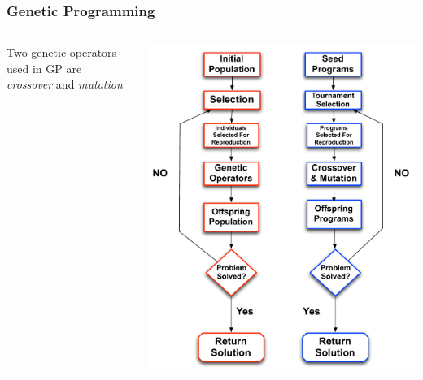 \documentclass{beamer}
\begin{document}
\begin{frame}
	\frametitle{Genetic Programming}

\begin{columns}[C]
\begin{column}{0.5\textwidth}


Two genetic operators used in GP are \textit{crossover} and \textit{mutation}


\end{column}
\begin{column}{0.5\textwidth}
   \includegraphics[height=0.85\textheight]{Illustrations/GP3.pdf}

\end{column}
\end{columns}

\end{frame}
\end{document}
